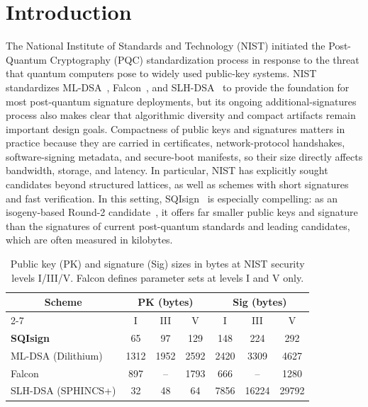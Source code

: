 \section{Introduction}
\label{sec:introduction}

The National Institute of Standards and Technology (NIST) initiated the Post-Quantum Cryptography (PQC) standardization process in response to the threat that quantum computers pose to widely used public-key systems.
NIST standardizes ML-DSA~\cite{MLDSA}, Falcon~\cite{PFH+20}, and SLH-DSA~\cite{SLHDSA} to provide the foundation for most post-quantum signature deployments,
but its ongoing additional-signatures process also makes clear that algorithmic diversity and compact artifacts remain important design goals.
Compactness of public keys and signatures matters in practice because they are carried in certificates, network-protocol handshakes, software-signing metadata, and secure-boot manifests, so their size directly affects bandwidth, storage, and latency.
In particular, NIST has explicitly sought candidates beyond structured lattices, as well as schemes with short signatures and fast verification.
In this setting, SQIsign~\cite{DKL+20} is especially compelling: as an isogeny-based Round-2 candidate~\cite{AAA+25},
it offers far smaller public keys and signature than the signatures of current post-quantum standards and leading candidates, which are often measured in kilobytes.

\begin{table}
\centering
\setlength{\tabcolsep}{6pt}
\renewcommand{\arraystretch}{1.1}

\begin{tabular}{|l|c|c|c|c|c|c|}
\hline
\multicolumn{1}{|c|}{\multirow[c]{2}{*}{Scheme}}
& \multicolumn{3}{c|}{PK (bytes)}
& \multicolumn{3}{c|}{Sig (bytes)} \\
\cline{2-7}
& I & III & V & I & III & V \\
\hline
\textbf{SQIsign}        & 65   & 97    & 129   & 148   & 224    & 292   \\
ML-DSA (Dilithium)      & 1312 & 1952  & 2592  & 2420  & 3309   & 4627  \\
Falcon                  & 897  & --    & 1793  & 666   & --     & 1280  \\
SLH-DSA (SPHINCS+)      & 32   & 48    & 64    & 7856  & 16224  & 29792 \\
\hline
\end{tabular}
\caption{Public key (PK) and signature (Sig) sizes in bytes at NIST security levels I/III/V. Falcon defines parameter sets at levels I and V only.}
\label{tab:pq-sig-sizes}
\end{table}

